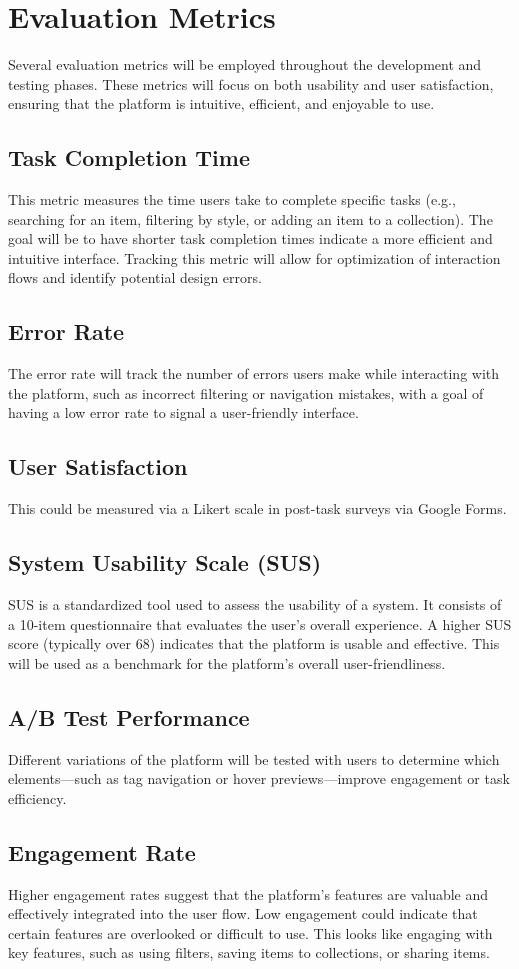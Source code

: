 \documentclass[10pt,twocolumn]{article}
\begin{document}
\section{Evaluation Metrics}
Several evaluation metrics will be employed throughout the development and testing phases. These metrics will focus on both usability and user satisfaction, ensuring that the platform is intuitive, efficient, and enjoyable to use.
\subsection{Task Completion Time}
This metric measures the time users take to complete specific tasks (e.g., searching for an item, filtering by style, or adding an item to a collection). The goal will be to have shorter task completion times indicate a more efficient and intuitive interface. Tracking this metric will allow for optimization of interaction flows and identify potential design errors.
\subsection{Error Rate}
The error rate will track the number of errors users make while interacting with the platform, such as incorrect filtering or navigation mistakes, with a goal of having a low error rate to signal a user-friendly interface.
\subsection{User Satisfaction}
This could be measured via a Likert scale in post-task surveys via Google Forms. 
\subsection{System Usability Scale (SUS)}
SUS is a standardized tool used to assess the usability of a system. It consists of a 10-item questionnaire that evaluates the user's overall experience. A higher SUS score (typically over 68) indicates that the platform is usable and effective. This will be used as a benchmark for the platform’s overall user-friendliness.
\subsection{A/B Test Performance}
Different variations of the platform will be tested with users to determine which elements—such as tag navigation or hover previews—improve engagement or task efficiency.
\subsection{Engagement Rate}
Higher engagement rates suggest that the platform’s features are valuable and effectively integrated into the user flow. Low engagement could indicate that certain features are overlooked or difficult to use. This looks like engaging with key features, such as using filters, saving items to collections, or sharing items.
\end{document}
